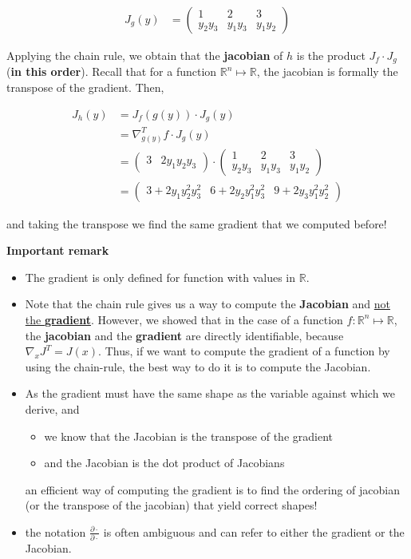 \documentclass{tufte-handout}
\begin{document}
\begin{align*}
J_g(y) &= 
\begin{pmatrix}
1 & 2 & 3\\
y_2y_3 &y_1y_3 & y_1y_2
\end{pmatrix}
\end{align*}

Applying the chain rule, we obtain that the \textbf{jacobian} of $ h $ is the product $ J_f \cdot J_g $ (\textbf{in this order}). Recall that for a function $ \mathbb{R}^n \mapsto \mathbb{R} $, the jacobian is formally the transpose of the gradient. Then, 


\begin{align*}
J_h (y) &= J_f(g(y))\cdot J_g(y)\\
&= \nabla_{g(y)}^T f \cdot J_g(y)\\
&= \begin{pmatrix}
3 & 2y_1y_2y_3
\end{pmatrix}\cdot 
\begin{pmatrix}
1 & 2 & 3\\
y_2y_3 &y_1y_3 & y_1y_2
\end{pmatrix}\\
&= 
\begin{pmatrix}
3 + 2y_1 y_2^2 y_3^2 & 6 + 2y_2y_1^2y_3^2 & 9 + 2y_3y_1^2y_2^2
\end{pmatrix}
\end{align*}

and taking the transpose we find the same gradient that we computed before!

\textbf{Important remark}
\begin{itemize}
\item The gradient is only defined for function with values in $ \mathbb{R} $. 
\item Note that the chain rule gives us a way to compute the \textbf{Jacobian} and \underline{not the \textbf{gradient}}. However, we showed that in the case of a function $ f: \mathbb{R}^n \mapsto \mathbb{R} $, the \textbf{jacobian} and the \textbf{gradient} are directly identifiable, because $ \nabla_x J^T = J (x) $. Thus, if we want to compute the gradient of a function by using the chain-rule, the best way to do it is to compute the Jacobian.
\item As the gradient must have the same shape as the variable against which we derive, and
\begin{itemize}
\item we know that the Jacobian is the transpose of the gradient
\item and the Jacobian is the dot product of Jacobians
\end{itemize} 
an efficient way of computing the gradient is to find the ordering of jacobian (or the transpose of the jacobian) that yield correct shapes!
\item the notation $ \frac{\partial \cdot }{\partial \cdot} $ is often ambiguous and can refer to either the gradient or the Jacobian. 
\end{itemize}

\end{document}
